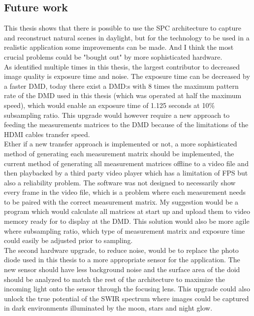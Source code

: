 \subsection{Future work}
This thesis shows that there is possible to use the SPC architecture to capture and reconstruct natural scenes in daylight, but for the technology to be used in a realistic application some improvements can be made. And I think the most crucial problems could be "bought out" by more sophisticated hardware.\\[0.1in]

As identified multiple times in this thesis, the largest contributor to decreased image quality is exposure time and noise. The exposure time can be decreased by a faster DMD, today there exist a DMD:s with 8 times the maximum pattern rate of the DMD used in this thesis (which was operated at half the maximum speed), which would enable an exposure time of 1.125 seconds at 10\% subsampling ratio. This upgrade would however require a new approach to feeding the measurements matrices to the DMD because of the limitations of the HDMI cables transfer speed.\\[0.1in]

Ether if a new transfer approach is implemented or not, a more sophisticated method of generating each measurement matrix should be implemented, the current method of generating all  measurement matrices offline to a video file and then playbacked by a third party video player which has a limitation of FPS but also a reliability problem. The software was not designed to necessarily show every frame in the video file, which is a problem where each measurement needs to be paired with the correct measurement matrix. My suggestion would be a program which would calculate all matrices at start up and upload them to video memory ready for to display at the DMD. This solution would also be more agile where subsampling ratio, which type of measurement matrix and exposure time could easily be adjusted prior to sampling.\\[0.1in]

The second hardware upgrade, to reduce noise, would be to replace the photo diode used in this thesis to a more appropriate sensor for the application. The new sensor should have less background noise and the surface area of the doid should be analyzed to match the rest of the architecture to maximize the incoming light onto the sensor through the focusing lens. This upgrade could also unlock the true potential of the SWIR spectrum where images could be captured in dark environments illuminated by the moon, stars and night glow.\\[0.1in]

